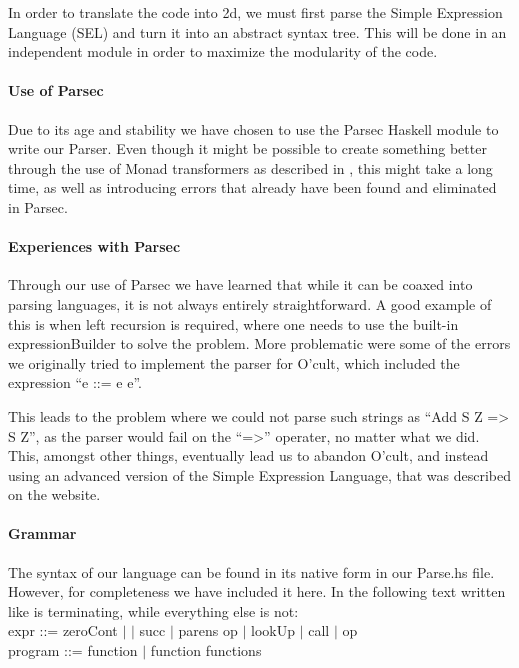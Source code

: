 \label{parser}
In order to translate the code into 2d, we must first parse the Simple
Expression Language (SEL) and turn it into an abstract syntax
tree. This will be done in an independent module in order to maximize
the modularity of the code.

\paragraph{Use of Parsec}
Due to its age and stability we have chosen to use the Parsec Haskell
module to write our Parser. Even though it might be possible to create
something better through the use of Monad transformers as described in
\cite{partial+parsing}, this might take a long time, as well as
introducing errors that already have been found and eliminated in
Parsec.

\paragraph{Experiences with Parsec}
Through our use of Parsec we have learned that while it can be coaxed
into parsing languages, it is not always entirely straightforward. A
good example of this is when left recursion is required, where one
needs to use the built-in expressionBuilder to solve the problem. More
problematic were some of the errors we originally tried to implement
the parser for O'cult, which included the expression ``e ::= e e''.

This leads to the problem where we could not parse such strings as
``Add S Z => S Z'', as the parser would fail on the ``=>'' operater,
no matter what we did. This, amongst other things, eventually lead us
to abandon O'cult, and instead using an advanced version of the Simple
Expression Language, that was described on the website.

\paragraph{Grammar}
The syntax of our language can be found in its native form in our
Parse.hs file. However, for completeness we have included it here. In
the following text written like  is terminating, while
everything else is not:\\

expr ::= zeroCont $\mid$  $\mid$ succ $\mid$ parens op $\mid$ lookUp $\mid$ call $\mid$ op\\

program ::= function $\mid$ function functions\\

